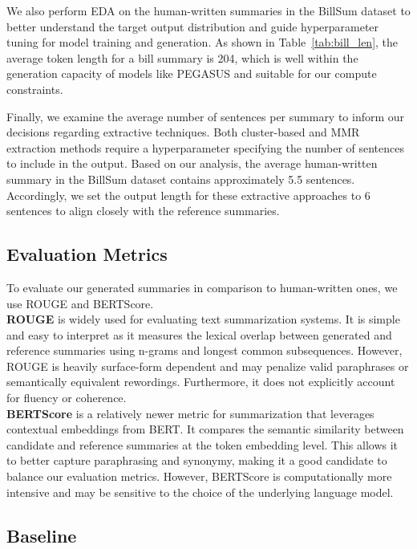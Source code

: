 \documentclass[11pt]{article}
\begin{document}
\indent We also perform EDA on the human-written summaries in the BillSum dataset to better understand the target output distribution and guide hyperparameter tuning for model training and generation. As shown in Table~\ref{tab:bill_len}, the average token length for a bill summary is 204, which is well within the generation capacity of models like PEGASUS and suitable for our compute constraints.

\indent Finally, we examine the average number of sentences per summary to inform our decisions regarding extractive techniques. Both cluster-based and MMR extraction methods require a hyperparameter specifying the number of sentences to include in the output. Based on our analysis, the average human-written summary in the BillSum dataset contains approximately 5.5 sentences. Accordingly, we set the output length for these extractive approaches to 6 sentences to align closely with the reference summaries.

\subsection{Evaluation Metrics}

To evaluate our generated summaries in comparison to human-written ones, we use ROUGE and BERTScore.\\

\noindent \textbf{ROUGE} is widely used for evaluating text summarization systems. It is simple and easy to interpret as it measures the lexical overlap between generated and reference summaries using n-grams and longest common subsequences. However, ROUGE is heavily surface-form dependent and may penalize valid paraphrases or semantically equivalent rewordings. Furthermore, it does not explicitly account for fluency or coherence.\\

\noindent \textbf{BERTScore} is a relatively newer metric for summarization that leverages contextual embeddings from BERT. It compares the semantic similarity between candidate and reference summaries at the token embedding level. This allows it to better capture paraphrasing and synonymy, making it a good candidate to balance our evaluation metrics. However, BERTScore is computationally more intensive and may be sensitive to the choice of the underlying language model.

\subsection{Baseline}
\end{document}
